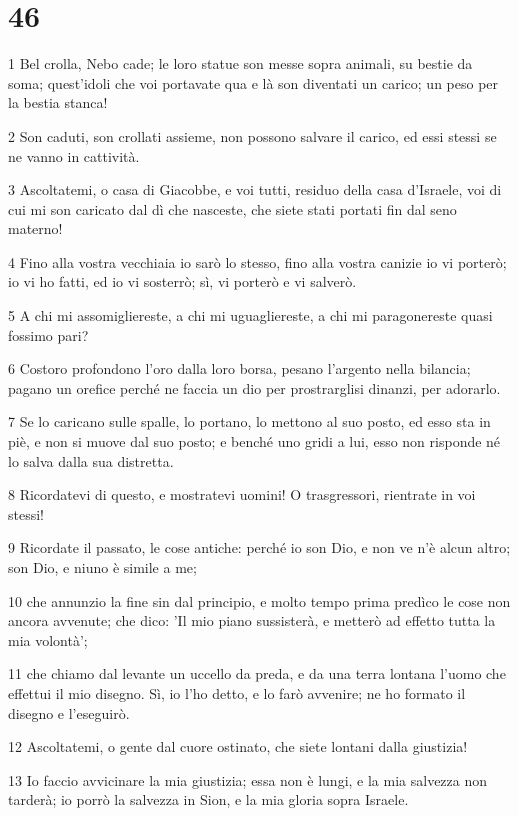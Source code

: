 \chapter{46}

\par 1 Bel crolla, Nebo cade; le loro statue son messe sopra animali, su bestie da soma; quest'idoli che voi portavate qua e là son diventati un carico; un peso per la bestia stanca!
\par 2 Son caduti, son crollati assieme, non possono salvare il carico, ed essi stessi se ne vanno in cattività.
\par 3 Ascoltatemi, o casa di Giacobbe, e voi tutti, residuo della casa d'Israele, voi di cui mi son caricato dal dì che nasceste, che siete stati portati fin dal seno materno!
\par 4 Fino alla vostra vecchiaia io sarò lo stesso, fino alla vostra canizie io vi porterò; io vi ho fatti, ed io vi sosterrò; sì, vi porterò e vi salverò.
\par 5 A chi mi assomigliereste, a chi mi uguagliereste, a chi mi paragonereste quasi fossimo pari?
\par 6 Costoro profondono l'oro dalla loro borsa, pesano l'argento nella bilancia; pagano un orefice perché ne faccia un dio per prostrarglisi dinanzi, per adorarlo.
\par 7 Se lo caricano sulle spalle, lo portano, lo mettono al suo posto, ed esso sta in piè, e non si muove dal suo posto; e benché uno gridi a lui, esso non risponde né lo salva dalla sua distretta.
\par 8 Ricordatevi di questo, e mostratevi uomini! O trasgressori, rientrate in voi stessi!
\par 9 Ricordate il passato, le cose antiche: perché io son Dio, e non ve n'è alcun altro; son Dio, e niuno è simile a me;
\par 10 che annunzio la fine sin dal principio, e molto tempo prima predìco le cose non ancora avvenute; che dico: 'Il mio piano sussisterà, e metterò ad effetto tutta la mia volontà';
\par 11 che chiamo dal levante un uccello da preda, e da una terra lontana l'uomo che effettui il mio disegno. Sì, io l'ho detto, e lo farò avvenire; ne ho formato il disegno e l'eseguirò.
\par 12 Ascoltatemi, o gente dal cuore ostinato, che siete lontani dalla giustizia!
\par 13 Io faccio avvicinare la mia giustizia; essa non è lungi, e la mia salvezza non tarderà; io porrò la salvezza in Sion, e la mia gloria sopra Israele.

